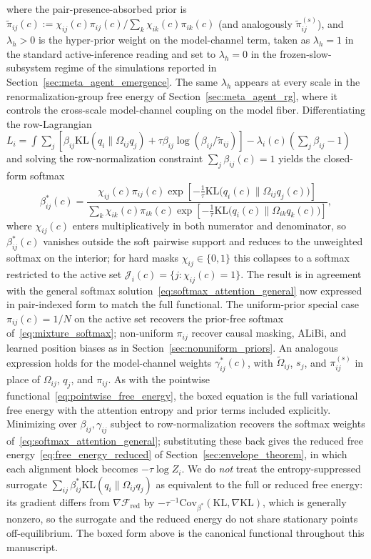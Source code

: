 \documentclass[11pt]{article}
\begin{document}
where the pair-presence-absorbed prior is $\tilde{\pi}_{ij}(c) := \chi_{ij}(c)\pi_{ij}(c) / \sum_k \chi_{ik}(c)\pi_{ik}(c)$ (and analogously $\tilde{\pi}^{(s)}_{ij}$), and $\lambda_h > 0$ is the hyper-prior weight on the model-channel term, taken as $\lambda_h = 1$ in the standard active-inference reading and set to $\lambda_h = 0$ in the frozen-slow-subsystem regime of the simulations reported in Section~\ref{sec:meta_agent_emergence}. The same $\lambda_h$ appears at every scale in the renormalization-group free energy of Section~\ref{sec:meta_agent_rg}, where it controls the cross-scale model-channel coupling on the model fiber. Differentiating the row-Lagrangian $L_i = \int \sum_j[\beta_{ij}\mathrm{KL}(q_i \| \Omega_{ij} q_j) + \tau\beta_{ij}\log(\beta_{ij}/\tilde{\pi}_{ij})] - \lambda_i(c)(\sum_j \beta_{ij} - 1)$ and solving the row-normalization constraint $\sum_j \beta_{ij}(c) = 1$ yields the closed-form softmax
\begin{equation}
\beta_{ij}^*(c) =
\frac{
  \chi_{ij}(c)\pi_{ij}(c)\exp\left[
    -\tfrac{1}{\tau}\mathrm{KL}\big(q_i(c) \big\| \Omega_{ij}q_j(c)\big)
  \right]
}{
  \displaystyle\sum_{k}
  \chi_{ik}(c)\pi_{ik}(c)\exp\left[
    -\tfrac{1}{\tau}\mathrm{KL}\big(q_i(c) \big\| \Omega_{ik}q_k(c)\big)
  \right]
},
\label{eq:beta_optimal}
\end{equation}
where $\chi_{ij}(c)$ enters multiplicatively in both numerator and denominator, so $\beta^*_{ij}(c)$ vanishes outside the soft pairwise support and reduces to the unweighted softmax on the interior; for hard masks $\chi_{ij} \in \{0, 1\}$ this collapses to a softmax restricted to the active set $\mathcal{J}_i(c) = \{j : \chi_{ij}(c) = 1\}$. The result is in agreement with the general softmax solution~\eqref{eq:softmax_attention_general} now expressed in pair-indexed form to match the full functional. The uniform-prior special case $\pi_{ij}(c) = 1/N$ on the active set recovers the prior-free softmax of~\eqref{eq:mixture_softmax}; non-uniform $\pi_{ij}$ recover causal masking, ALiBi, and learned position biases as in Section~\ref{sec:nonuniform_priors}. An analogous expression holds for the model-channel weights $\gamma_{ij}^*(c)$, with $\tilde{\Omega}_{ij}$, $s_j$, and $\pi^{(s)}_{ij}$ in place of $\Omega_{ij}$, $q_j$, and $\pi_{ij}$.
As with the pointwise functional~\eqref{eq:pointwise_free_energy}, the boxed equation is the full variational free energy with the attention entropy and prior terms included explicitly. Minimizing over $\beta_{ij}, \gamma_{ij}$ subject to row-normalization recovers the softmax weights of~\eqref{eq:softmax_attention_general}; substituting these back gives the reduced free energy~\eqref{eq:free_energy_reduced} of Section~\ref{sec:envelope_theorem}, in which each alignment block becomes $-\tau \log Z_i$. We do \emph{not} treat the entropy-suppressed surrogate $\sum_{ij} \beta^*_{ij}\mathrm{KL}(q_i \| \Omega_{ij}q_j)$ as equivalent to the full or reduced free energy: its gradient differs from $\nabla\mathcal{F}_{\mathrm{red}}$ by $-\tau^{-1}\mathrm{Cov}_{\beta^*}(\mathrm{KL}, \nabla \mathrm{KL})$, which is generally nonzero, so the surrogate and the reduced energy do not share stationary points off-equilibrium. The boxed form above is the canonical functional throughout this manuscript.
\end{document}
